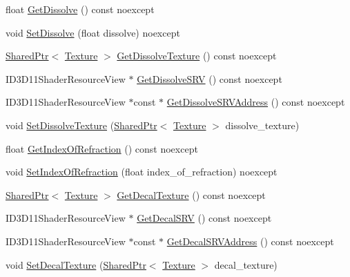 \begin{DoxyCompactItemize}
\item 
float \hyperlink{structmage_1_1_material_aa320c6b371b9f055a76821db71d185bc}{Get\+Dissolve} () const noexcept
\item 
void \hyperlink{structmage_1_1_material_ad86de160f4e4e03c24329d8f9415ccaa}{Set\+Dissolve} (float dissolve) noexcept
\item 
\hyperlink{namespacemage_a1e01ae66713838a7a67d30e44c67703e}{Shared\+Ptr}$<$ \hyperlink{classmage_1_1_texture}{Texture} $>$ \hyperlink{structmage_1_1_material_abcf6fa7acad8c0cda8859e32eb2c3168}{Get\+Dissolve\+Texture} () const noexcept
\item 
I\+D3\+D11\+Shader\+Resource\+View $\ast$ \hyperlink{structmage_1_1_material_adb87e492a57c7539776a311a2e454167}{Get\+Dissolve\+S\+RV} () const noexcept
\item 
I\+D3\+D11\+Shader\+Resource\+View $\ast$const  $\ast$ \hyperlink{structmage_1_1_material_a9a50e538b24f15129fd95c1272fc82be}{Get\+Dissolve\+S\+R\+V\+Address} () const noexcept
\item 
void \hyperlink{structmage_1_1_material_ae2afaedc1d81fc753b060cca5d86db91}{Set\+Dissolve\+Texture} (\hyperlink{namespacemage_a1e01ae66713838a7a67d30e44c67703e}{Shared\+Ptr}$<$ \hyperlink{classmage_1_1_texture}{Texture} $>$ dissolve\+\_\+texture)
\item 
float \hyperlink{structmage_1_1_material_afa719020dabd412bbb06ac9f0d85abe9}{Get\+Index\+Of\+Refraction} () const noexcept
\item 
void \hyperlink{structmage_1_1_material_ae0f95f54af97ecff043ec7728260ae2b}{Set\+Index\+Of\+Refraction} (float index\+\_\+of\+\_\+refraction) noexcept
\item 
\hyperlink{namespacemage_a1e01ae66713838a7a67d30e44c67703e}{Shared\+Ptr}$<$ \hyperlink{classmage_1_1_texture}{Texture} $>$ \hyperlink{structmage_1_1_material_a7cf62e3f72b74c945e3d5c47c2c73485}{Get\+Decal\+Texture} () const noexcept
\item 
I\+D3\+D11\+Shader\+Resource\+View $\ast$ \hyperlink{structmage_1_1_material_a8d189673acfe8d0c104873fe0cceb601}{Get\+Decal\+S\+RV} () const noexcept
\item 
I\+D3\+D11\+Shader\+Resource\+View $\ast$const  $\ast$ \hyperlink{structmage_1_1_material_aaafa9944c4069c983ef2cff9f84e8039}{Get\+Decal\+S\+R\+V\+Address} () const noexcept
\item 
void \hyperlink{structmage_1_1_material_ad52bf9c9d802fce7f7ec47f35a44d180}{Set\+Decal\+Texture} (\hyperlink{namespacemage_a1e01ae66713838a7a67d30e44c67703e}{Shared\+Ptr}$<$ \hyperlink{classmage_1_1_texture}{Texture} $>$ decal\+\_\+texture)

\end{DoxyCompactItemize}
